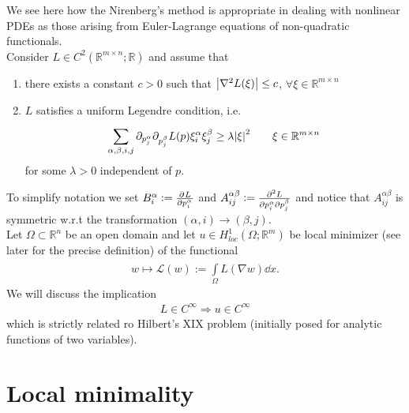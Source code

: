 We see here how the Nirenberg's method is appropriate in dealing with nonlinear PDEs as those arising from Euler-Lagrange equations of non-quadratic functionals. \\
Consider \( L \in C^{2}(\mathbb{R}^{m \times n}; \mathbb{R})  \) and assume that
\begin{enumerate}[label= (\roman*)]
	\item there exists a constant \(  c>0 \) such that \( \abs{\nabla ^{2}L(\xi) } \leq c \), \( \forall \xi \in \mathbb{R}^{m \times n} \)
	\item \( L \) satisfies a uniform Legendre condition, i.e.
	      \begin{gather}
		      \sum\limits_{\alpha , \beta , i ,j }^{} \partial_{p_{j}^{\alpha }} \partial_{p_{j}^{\beta }} L(p) \xi _{i}^{\alpha } \xi _{j}^{\beta } \geq \lambda \abs{ \xi }^{2} \qquad \xi \in \mathbb{R}^{m \times n}
	      \end{gather}
	      for some \( \lambda >0  \) independent of \( p \).
\end{enumerate}
To simplify notation we set \( B_{i}^{\alpha }:= \pdv[]{L}{{p_{i}^{\alpha}}} \) and \( A_{ij}^{\alpha \beta } := \pdv[]{L}{{p_{i}^{\alpha}}}{{p_{j}^{\beta }}} \) and notice that \( A_{ij}^{\alpha \beta } \) is symmetric w.r.t the transformation \( (\alpha ,i)  \to (\beta , j) \). \\
Let \( \Omega \subset \mathbb{R}^{n} \) be an open domain and let \( u \in  H_{loc}^{1}(\Omega ; \mathbb{R}^{m})  \) be local minimizer (see later for the precise definition) of the functional
\begin{gather}
	w \mapsto \mathcal{L}(w) := \int\limits_{\Omega}^{} L(\nabla w)  \dd{x}.
\end{gather}
We will discuss the implication
\begin{gather}
	L \in  C^{\infty } \Rightarrow u \in  C^{\infty }
\end{gather}
which is strictly related ro Hilbert's XIX problem (initially posed for analytic functions of two variables).

\section{Local minimality}

